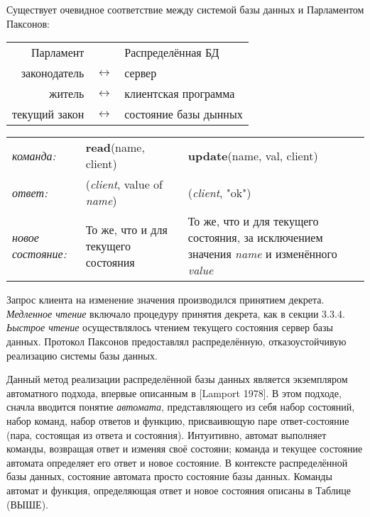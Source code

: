 \documentclass[12pt, a4paper]{article} %
\begin{document}
Существует очевидное соответствие между системой базы данных и Парламентом Паксонов:
\begin{table}[h]
\begin{tabular}{rcl}
    Парламент&&Распределённая БД\\
    законодатель&$\leftrightarrow$&сервер\\
    житель&$\leftrightarrow$&клиентская программа\\
    текущий закон&$\leftrightarrow$&состояние базы дынных\\
\end{tabular}
\end{table}
\begin{table}[h]
\begin{tabular}{llp{4cm}}
    \textit{команда:}&\textbf{read}(name, client)&\textbf{update}(name, val, client)\\
    \textit{ответ:}&(\textit{client}, value of \textit{name})&(\textit{client}, "ok")\\
    \textit{новое состояние:}&То же, что и для текущего состояния&То же, что и для текущего состояния, за исключением значения \textit{name} и изменённого \textit{value}\\
\end{tabular}
\end{table}
Запрос клиента на изменение значения производился принятием декрета. \textit{Медленное чтение} включало процедуру принятия декрета, как в секции 3.3.4. \textit{Ьыстрое чтение} осуществлялось чтением текущего состояния сервер базы данных. Протокол Паксонов предоставлял распределённую, отказоустойчивую реализацию системы базы данных.

Данный метод реализации распределённой базы данных является экземпляром автоматного подхода, впервые описанным в [Lamport 1978]. В этом подходе, сначла вводится понятие \textit{автомата}, представляющего из себя набор состояний, набор команд, набор ответов и функцию, присваивющую паре ответ-состояние (пара, состоящая из ответа и состояния). Интуитивно, автомат выполняет команды, возвращая ответ и изменяя своё состояни; команда и текущее состояние автомата определяет его ответ и новое состояние. В контексте распределённой базы данных, состояние автомата просто состояние базы данных. Команды автомат и функция, определяющая ответ и новое состояния описаны в Таблице (ВЫШЕ).
\end{document}
